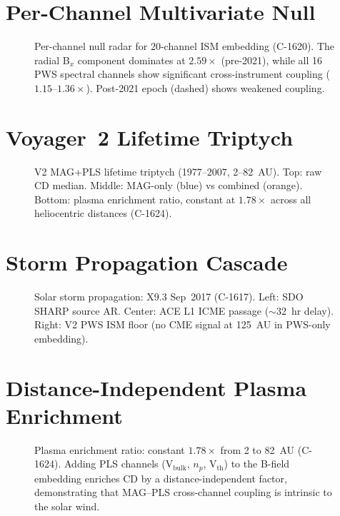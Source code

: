 \documentclass[12pt,openany]{report}
\theoremstyle{definition}
\theoremstyle{plain}
\theoremstyle{remark}
\begin{document}
\section{Per-Channel Multivariate Null}

\begin{figure}[htbp]
\centering
\resizebox{0.75\textwidth}{!}{}
\caption{Per-channel null radar for 20-channel ISM embedding (C-1620).
The radial B$_x$ component dominates at $2.59\times$ (pre-2021), while
all 16 PWS spectral channels show significant cross-instrument coupling
($1.15$--$1.36\times$).  Post-2021 epoch (dashed) shows weakened coupling.}
\label{fig:channel-null}
\end{figure}

\section{Voyager~2 Lifetime Triptych}

\begin{figure}[htbp]
\centering
\resizebox{\textwidth}{!}{}
\caption{V2 MAG+PLS lifetime triptych (1977--2007, 2--82~AU).
Top: raw CD median.  Middle: MAG-only (blue) vs combined (orange).
Bottom: plasma enrichment ratio, constant at $1.78\times$ across all
heliocentric distances (C-1624).}
\label{fig:v2-triptych}
\end{figure}

\section{Storm Propagation Cascade}

\begin{figure}[htbp]
\centering
\resizebox{\textwidth}{!}{}
\caption{Solar storm propagation: X9.3 Sep~2017 (C-1617).
Left: SDO SHARP source AR.  Center: ACE L1 ICME passage ($\sim$32~hr delay).
Right: V2 PWS ISM floor (no CME signal at 125~AU in PWS-only embedding).}
\label{fig:storm-cascade}
\end{figure}

\section{Distance-Independent Plasma Enrichment}

\begin{figure}[htbp]
\centering
\resizebox{\textwidth}{!}{}
\caption{Plasma enrichment ratio: constant $1.78\times$ from 2 to 82~AU (C-1624).
Adding PLS channels (V$_\mathrm{bulk}$, $n_p$, V$_\mathrm{th}$) to the B-field
embedding enriches CD by a distance-independent factor, demonstrating that
MAG--PLS cross-channel coupling is intrinsic to the solar wind.}
\label{fig:plasma-enrichment}
\end{figure}
\end{document}
